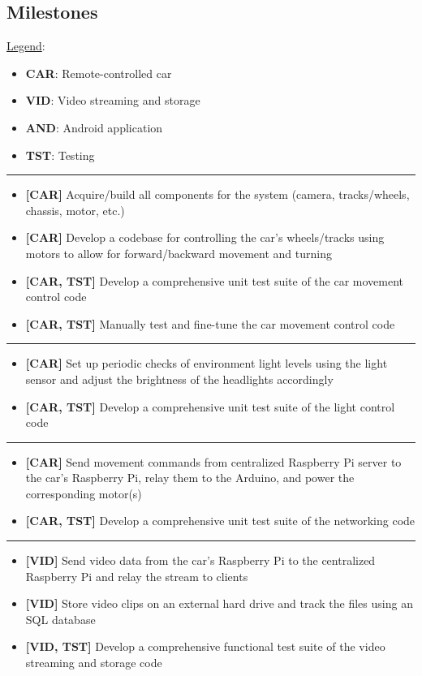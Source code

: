 \documentclass[letterpaper,12pt]{report}
\begin{document}
	\subsection*{Milestones}
	\markright{}
	\underline{Legend}:
	\begin{itemize}
		\item[] \textbf{CAR}: Remote-controlled car
		\item[] \textbf{VID}: Video streaming and storage
		\item[] \textbf{AND}: Android application
		\item[] \textbf{TST}: Testing
	\end{itemize}
	\noindent\rule{\textwidth}{0.5pt}
	\begin{itemize}
		\item \textbf{[CAR]} Acquire/build all components for the system (camera, tracks/wheels, chassis, motor, etc.)
		\item \textbf{[CAR]} Develop a codebase for controlling the car’s wheels/tracks using motors to allow for forward/backward movement and turning
		\item \textbf{[CAR, TST]} Develop a comprehensive unit test suite of the car movement control code
		\item \textbf{[CAR, TST]} Manually test and fine-tune the car movement control code
	\end{itemize}
	\noindent\rule{\textwidth}{0.5pt}
	\begin{itemize}
		\item \textbf{[CAR]} Set up periodic checks of environment light levels using the light sensor and adjust the brightness of the headlights accordingly
		\item \textbf{[CAR, TST]} Develop a comprehensive unit test suite of the light control code
	\end{itemize}
	\noindent\rule{\textwidth}{0.5pt}
	\begin{itemize}
		\item \textbf{[CAR]} Send movement commands from centralized Raspberry Pi server to the car’s Raspberry Pi, relay them to the Arduino, and power the corresponding motor(s)
		\item \textbf{[CAR, TST]} Develop a comprehensive unit test suite of the networking code
	\end{itemize}
	\noindent\rule{\textwidth}{0.5pt}
	\begin{itemize}
		\item \textbf{[VID]} Send video data from the car’s Raspberry Pi to the centralized Raspberry Pi and relay the stream to clients
		\item \textbf{[VID]} Store video clips on an external hard drive and track the files using an SQL database
		\item \textbf{[VID, TST]} Develop a comprehensive functional test suite of the video streaming and storage code
	\end{itemize}
\end{document}
